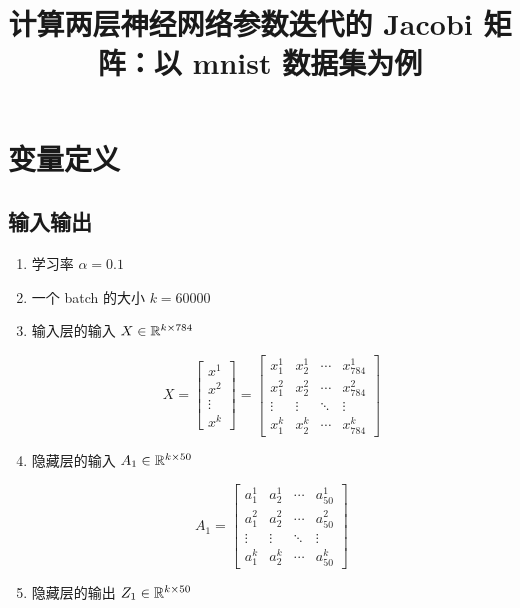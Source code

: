 \documentclass[12pt,a4paper]{amsart}
\title{计算两层神经网络参数迭代的 Jacobi 矩阵：以 mnist 数据集为例}
\begin{document}
\maketitle

\section{变量定义}

\subsection{输入输出}

\begin{enumerate}
	\item 学习率 $\alpha = 0.1$
	\item 一个 batch 的大小 $k = 60000$
	\item 输入层的输入 $X \in \mathbb{R}^{k \times 784}$

		\begin{equation}
			X = \begin{bmatrix}
				x^1    \\
				x^2    \\
				\vdots \\
				x^k
			\end{bmatrix} = \begin{bmatrix}
				x_1^1  & x_2^1  & \cdots & x_{784}^1 \\
				x_1^2  & x_2^2  & \cdots & x_{784}^2 \\
				\vdots & \vdots & \ddots & \vdots    \\
				x_1^k  & x_2^k  & \cdots & x_{784}^k
			\end{bmatrix}
		\end{equation}

	\item 隐藏层的输入 $A_1 \in \mathbb{R}^{k \times 50}$

		\begin{equation}
			A_1 = \begin{bmatrix}
				a_1^1  & a_2^1  & \cdots & a_{50}^1 \\
				a_1^2  & a_2^2  & \cdots & a_{50}^2 \\
				\vdots & \vdots & \ddots & \vdots    \\
				a_1^k  & a_2^k  & \cdots & a_{50}^k
			\end{bmatrix}
		\end{equation}

	\item 隐藏层的输出 $Z_1 \in \mathbb{R}^{k \times 50}$


\end{enumerate}
\end{document}
